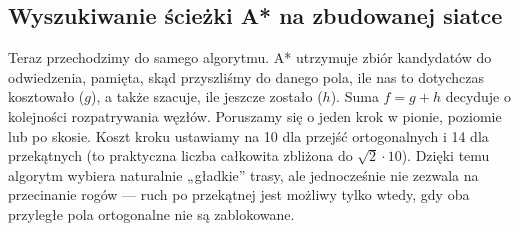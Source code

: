 \documentclass[a4paper,12pt]{book} %
\begin{document}
\subsection{Wyszukiwanie ścieżki A* na zbudowanej siatce}

Teraz przechodzimy do samego algorytmu. A* utrzymuje zbiór kandydatów do odwiedzenia, pamięta, skąd przyszliśmy do danego pola, ile nas to dotychczas kosztowało (\(g\)), a także szacuje, ile jeszcze zostało (\(h\)). Suma \(f=g+h\) decyduje o kolejności rozpatrywania węzłów. Poruszamy się o jeden krok w pionie, poziomie lub po skosie. Koszt kroku ustawiamy na 10 dla przejść ortogonalnych i 14 dla przekątnych (to praktyczna liczba całkowita zbliżona do \(\sqrt{2}\cdot 10\)). Dzięki temu algorytm wybiera naturalnie „gładkie” trasy, ale jednocześnie nie zezwala na przecinanie rogów — ruch po przekątnej jest możliwy tylko wtedy, gdy oba przyległe pola ortogonalne nie są zablokowane.
\end{document}
